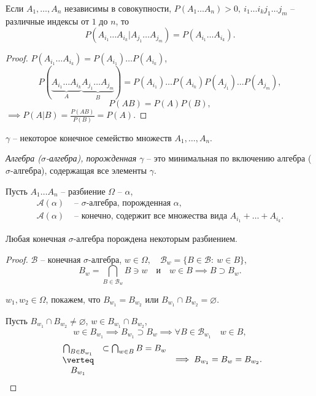 \begin{theorem}
  Если $A_1,\ldots,A_n$ независимы в совокупности, $P(A_1 \ldots A_n) > 0, \ i_1 \ldots i_k j_1 \ldots j_m$ -- различные индексы от $1$ до $n$, то
  \[
    P(A_{i_1}\ldots A_{i_k}|A_{j_1}\ldots A_{j_m}) = P(A_{i_1}\ldots A_{i_k}).
  \]
\end{theorem}

\begin{proof}
  $P(A_{i_1}\ldots A_{i_k}) = P(A_{i_1})\ldots P(A_{i_k})$,
  \[
    P \left(\underbrace{A_{i_1}\ldots A_{i_k}}_{A}\underbrace{A_{j_1}\ldots A_{j_m}}_{B}\right) = P(A_{i_1})\ldots P(A_{i_k})P(A_{j_1})\ldots P(A_{j_m}),
  \]
  \[
    P(AB) = P(A)P(B),
  \]
  $\implies P(A|B) = \frac{P(AB)}{P(B)} = P(A)$.
\end{proof}

\begin{definition}
  $\gamma$ -- некоторое конечное семейство множеств $A_1,\ldots,A_n$.

  \emph{Алгебра ($\sigma$-алгебра), порожденная $\gamma$} -- это минимальная по включению алгебра ($\sigma$-алгебра), содержащая все элементы $\gamma$.

  Пусть $A_1 \ldots A_n$ -- разбиение $\Omega$ -- $\alpha$,
  \begin{align*}
    \mathcal{A}(\alpha) &\text{ -- } \sigma \text{-алгебра, порожденная } \alpha, \\
    \mathcal{A}(\alpha) &\text{ -- конечно, содержит все множества вида }A_{i_1} + \ldots + A_{i_k}.
  \end{align*}
\end{definition}

\begin{theorem}
  Любая конечная $\sigma$-алгебра порождена некоторым разбиением.
\end{theorem}

\begin{proof}
  $\mathcal{B}$ -- конечная $\sigma$-алгебра, $w \in \Omega, \quad \mathcal{B}_w = \{B \in \mathcal{B}: \ w \in B\}$,
  \[
    B_w = \bigcap_{B \in \mathcal{B}_w}B \ni w \quad \text{и} \quad w \in B \implies B \supset B_w. 
  \]

  $w_1,w_2 \in \Omega$, покажем, что $B_{w_1} = B_{w_2}$ или $B_{w_1}\cap B_{w_2} = \varnothing$.

  Пусть $B_{w_1}\cap B_{w_2} \ne \varnothing $, $w \in B_{w_1}\cap B_{w_2}$,
  \[
    w \in B_{w_1} \implies B_{w_1} \supset B_w \implies \forall B \in \mathcal{B}_{w_1} \quad w \in B,
  \]
  \[
    \begin{array}{cc}
      \bigcap_{B \in \mathcal{B}_{w_1}} &\subset \bigcap_{w\in B}B = B_w \\
      \verteq & \\
      B_{w_1} &
    \end{array} \implies B_{w_1} = B_w = B_{w_2}.
  \]
\end{proof}


